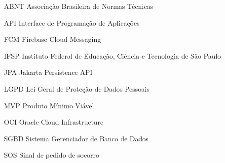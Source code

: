 \begin{siglas}
  \item[ABNT] Associação Brasileira de Normas Técnicas
  \item[API] Interface de Programação de Aplicações
  \item[FCM] Firebase Cloud Messaging
  \item[IFSP] Instituto Federal de Educação, Ciência e Tecnologia de São Paulo
  \item[JPA] Jakarta Persistence API
  \item[LGPD] Lei Geral de Proteção de Dados Pessoais
  \item[MVP] Produto Mínimo Viável
  \item[OCI] Oracle Cloud Infrastructure
  \item[SGBD] Sistema Gerenciador de Banco de Dados
  \item[SOS] Sinal de pedido de socorro
\end{siglas}
